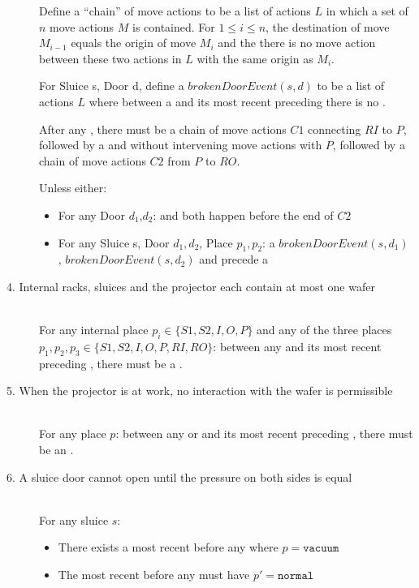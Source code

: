 \begin{description}
 Define a ``chain'' of move actions to be a list of actions $L$  in which a set of $n$ move actions $M$ is contained. For $1 \leq i \leq n$, the destination of move $M_{i-1}$ equals the origin of move $M_{i}$ and the there is no move action between these two actions in $L$ with the same origin as $M_{i}$.
 
For Sluice s, Door d, define a $brokenDoorEvent(s,d)$  to be a list of actions $L$ where between a  and its most recent preceding  there is no .
 
 After any , there must be a chain of move actions $C1$ connecting $RI$ to $P$, followed by a  and  without intervening move actions with $P$, followed by a chain of move actions $C2$ from $P$ to $RO$.
 
 Unless either:
 \begin{itemize}
 \item For any Door $d_1$,$d_2$:  and  both happen before the end of $C2$
 
 \item For any Sluice s, Door $d_1,d_2$, Place $p_1,p_2$: a $brokenDoorEvent(s,d_1)$ , $brokenDoorEvent(s,d_2)$ and   precede a  
 \end{itemize}
 
 
\item[4. Internal racks, sluices and the projector each contain at most one wafer] \hfill \\
For any internal place $p_i \in \{S1, S2, I, O, P\}$ and any of the three places $p_1, p_2, p_3 \in \{S1, S2, I, O, P, RI, RO\}$: between any  and its most recent preceding , there must be a . 
 
\item[5. When the projector is at work, no interaction with the wafer is permissible] \hfill \\
For any place $p$: between any  or  and its most recent preceding , there must be an . 
 
 \item[6. A sluice door cannot open until the pressure on both sides is equal] \hfill \\
 For any sluice $s$:
 \begin{itemize}
  \item There exists a most recent  before any  where $p = \texttt{vacuum}$
  \item The most recent  before any  must have $p' = \texttt{normal}$


\end{itemize}
\end{description}
